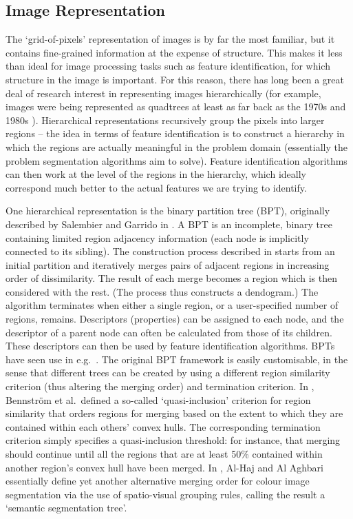 \subsection{Image Representation}
\label{subsec:background-partitionhierarchies-imagerepresentation}

The `grid-of-pixels' representation of images is by far the most familiar, but it contains fine-grained information at the expense of structure. This makes it less than ideal for image processing tasks such as feature identification, for which structure in the image is important. For this reason, there has long been a great deal of research interest in representing images hierarchically (for example, images were being represented as quadtrees at least as far back as the 1970s \cite{klinger76} and 1980s \cite{ahuja83,samet80}). Hierarchical representations recursively group the pixels into larger regions -- the idea in terms of feature identification is to construct a hierarchy in which the regions are actually meaningful in the problem domain (essentially the problem segmentation algorithms aim to solve). Feature identification algorithms can then work at the level of the regions in the hierarchy, which ideally correspond much better to the actual features we are trying to identify.

One hierarchical representation is the binary partition tree (BPT), originally described by Salembier and Garrido in \cite{salembier00}. A BPT is an incomplete, binary tree containing limited region adjacency information (each node is implicitly connected to its sibling). The construction process described in \cite{salembier00} starts from an initial partition and iteratively merges pairs of adjacent regions in increasing order of dissimilarity. The result of each merge becomes a region which is then considered with the rest. (The process thus constructs a dendogram.) The algorithm terminates when either a single region, or a user-specified number of regions, remains. Descriptors (properties) can be assigned to each node, and the descriptor of a parent node can often be calculated from those of its children. These descriptors can then be used by feature identification algorithms. BPTs have seen use in e.g.~\cite{cooray01,salembier02}. The original BPT framework is easily customisable, in the sense that different trees can be created by using a different region similarity criterion (thus altering the merging order) and termination criterion. In \cite{bennstrom04}, Bennstr\"om et al.\ defined a so-called `quasi-inclusion' criterion for region similarity that orders regions for merging based on the extent to which they are contained within each others' convex hulls. The corresponding termination criterion simply specifies a quasi-inclusion threshold: for instance, that merging should continue until all the regions that are at least 50\% contained within another region's convex hull have been merged. In \cite{al-haj08}, Al-Haj and Al Aghbari essentially define yet another alternative merging order for colour image segmentation via the use of spatio-visual grouping rules, calling the result a `semantic segmentation tree'.

